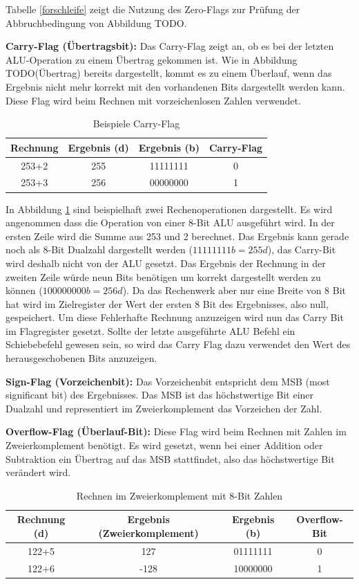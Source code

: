 \documentclass[12pt]{article}
\begin{document}
Tabelle \ref{forschleife} zeigt die Nutzung des Zero-Flags zur Prüfung der Abbruchbedingung von Abbildung TODO.


\noindent \textbf{Carry-Flag (Übertragsbit):} Das Carry-Flag zeigt an, ob es bei der letzten ALU-Operation zu einem Übertrag gekommen ist. Wie in Abbildung TODO(Übertrag) bereits dargestellt, kommt es zu einem Überlauf, wenn das Ergebnis nicht mehr korrekt mit den vorhandenen Bits dargestellt werden kann. Diese Flag wird beim Rechnen mit vorzeichenlosen Zahlen verwendet.

\begin{table}[!htb]
\centering
\label{carry}
\begin{tabular}{|c|c|c|c|}
\hline
Rechnung & Ergebnis (d) & Ergebnis (b) & Carry-Flag \\ \hline \hline
253+2    & 255          & 11111111     & 0          \\ \hline \hline
253+3    & 256          & 00000000     & 1          \\ \hline
\end{tabular}
\caption{Beispiele Carry-Flag}
\end{table}
In Abbildung \ref{carry} sind beispielhaft zwei Rechenoperationen dargestellt. Es wird angenommen dass die Operation von einer 8-Bit ALU ausgeführt wird. In der ersten Zeile wird die Summe aus 253 und 2 berechnet. Das Ergebnis kann gerade noch als 8-Bit Dualzahl dargestellt werden ($11111111b = 255d$), das Carry-Bit wird deshalb nicht von der ALU gesetzt. Das Ergebnis der Rechnung in der zweiten Zeile  würde neun Bits benötigen um korrekt dargestellt werden zu können ($100000000b = 256d$). Da das Rechenwerk aber nur eine Breite von 8 Bit hat wird im Zielregister der Wert der ersten 8 Bit des Ergebnisses, also null, gespeichert. Um diese Fehlerhafte Rechnung anzuzeigen wird nun das Carry Bit im Flagregister gesetzt.  
Sollte der letzte ausgeführte ALU Befehl ein Schiebebefehl gewesen sein, so wird das Carry Flag dazu verwendet den Wert des herausgeschobenen Bits anzuzeigen.


\noindent \textbf{Sign-Flag (Vorzeichenbit):} Das Vorzeichenbit entspricht dem MSB (most significant bit) des Ergebnisses. Das MSB ist das höchstwertige Bit einer Dualzahl und representiert im Zweierkomplement das Vorzeichen der Zahl.

\noindent \textbf{Overflow-Flag (Überlauf-Bit):} Diese Flag wird beim Rechnen mit Zahlen im Zweierkomplement benötigt. Es wird gesetzt, wenn bei einer Addition oder Subtraktion ein Übertrag auf das MSB stattfindet, also das höchstwertige Bit verändert wird. 
\begin{table}[!htb]
\centering
\label{overflow}
\begin{tabular}{|c|c|c|c|}
\hline
Rechnung (d) & Ergebnis (Zweierkomplement) & Ergebnis (b) & Overflow-Bit \\ \hline \hline
122+5        & 127                         & 01111111     & 0            \\ \hline \hline
122+6        & -128                        & 10000000      & 1            \\ \hline
\end{tabular}
\caption{Rechnen im Zweierkomplement mit 8-Bit Zahlen}
\end{table}
\end{document}
